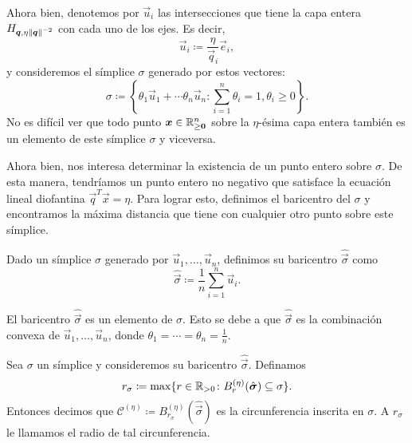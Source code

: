 Ahora bien, denotemos por $\vec{u}_i$ las intersecciones que tiene la capa entera $H_{\boldsymbol{q},
\eta\left\lVert \boldsymbol{q} \right\rVert^{-2}}$ con cada uno de los ejes. Es decir,
\begin{equation*}
	\vec{u}_i \coloneq \frac{\eta}{\vec{q}_i}\vec{e}_i,
\end{equation*}
y consideremos el símplice $\sigma$ generado por estos vectores:
\begin{equation*}
	\sigma \coloneq \left\lbrace \theta_1\vec{u}_1 + \cdots \theta_n\vec{u}_n \colon
		\sum_{i=1}^{n}\theta_i = 1, \theta_i \geq 0 \right\rbrace.
\end{equation*}
No es difícil ver que todo punto $\boldsymbol{x} \in \mathbb{R}^n_{\geq \boldsymbol{0}}$ sobre la $\eta$-ésima capa entera
también es un elemento de este símplice $\sigma$ y viceversa.

Ahora bien, nos interesa determinar la existencia de un punto entero sobre $\sigma$. De esta manera,
tendríamos un punto entero no negativo que satisface la ecuación lineal diofantina
$\vec{q}^T\vec{x} = \eta$. Para lograr esto, definimos el baricentro del $\sigma$ y
encontramos la máxima distancia que tiene con cualquier otro punto sobre este símplice.

\begin{definition}
	Dado un símplice $\sigma$ generado por $\vec{u}_1, \ldots, \vec{u}_n$, definimos su baricentro
	$\hat{\vec{\sigma}}$ como
	\begin{equation*}
		\hat{\vec{\sigma}} \coloneq \frac{1}{n} \sum_{i=1}^{n}\vec{u}_i.
	\end{equation*}
\end{definition}
\begin{observation}
	El baricentro $\hat{\vec{\sigma}}$ es un elemento de $\sigma$. Esto se debe a que $\hat{\vec{\sigma}}$ es la
	combinación convexa de $\vec{u}_1, \ldots, \vec{u}_n$, donde $\theta_1 = \cdots = \theta_n =
	\frac{1}{n}$.
\end{observation}

\begin{definition}
	Sea $\sigma$ un símplice y consideremos su baricentro $\hat{\vec{\sigma}}$. Definamos
	\begin{equation}
		\label{eq:def:r-sigma}
		r_\sigma \coloneq \max \lbrace r \in \mathbb{R}_{>0} \colon B_r^{(\eta)}(\hat{\boldsymbol{\sigma}})
		\subseteq \sigma \rbrace.
	\end{equation}
	Entonces decimos que $\mathcal{C}^{(\eta)} \coloneq
	B_{r_\sigma}^{(\eta)}(\hat{\vec{\sigma}})$ es la circunferencia inscrita en $\sigma$. A
	$r_\sigma$ le llamamos el radio de tal circunferencia.
\end{definition}

